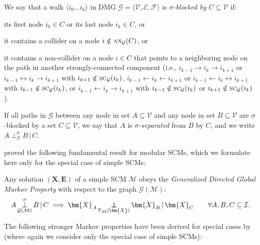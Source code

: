 \documentclass[twoside,11pt]{article}
\DeclareMathOperator*{\CI}{{\,\perp\mkern-12mu\perp\,}}
\DeclareMathOperator*{\SEP}{\perp}
\newcommand\indep[4]{{#1} \CI_{#4} {#2} \given {#3}}
\newcommand{\sigmasep}[4]{{#1} \SEP_{#4}^\sigma {#2} \given {#3}}
\newcommand{\Prb}{\mathbb{P}}
\newcommand\B[1]{\bm{#1}}
\newcommand\C[1]{\mathcal{#1}}
\newcommand\mathbfsc[1]{\text{\normalfont\scshape#1}}
\newcommand\ansub[2]{\mathbfsc{an}_{#1}(#2)}
\newcommand\sccsub[2]{\mathbfsc{sc}_{#1}(#2)}
\newcommand\given{\,|\,}
\newcommand{\ot}{\leftarrow}
\newcommand{\oto}{\leftrightarrow}
\begin{document}
\begin{definition}
We say that a walk $\langle i_0 \dots i_k \rangle$ in DMG $\C{G} = \langle \C{V},\C{E},\C{F} \rangle$ is \emph{$\sigma$-blocked by $C \subseteq \C{V}$} if:
\begin{compactenum}[(i)]
\item its first node $i_0 \in C$ or its last node $i_k \in C$, or
\item it contains a collider on a node $i \notin \ansub{\C{G}}{C}$, or
\item it contains a non-collider on a node $i \in C$ that points to a 
neighboring node on the path in another strongly-connected component (i.e.,
$i_{k-1} \to i_k \to i_{k+1}$ or $i_{k-1}\oto i_k \to i_{k+1}$ with $i_{k+1} \notin \sccsub{\C{G}}{i_k}$,
$i_{k-1} \ot i_k \ot i_{k+1}$ or $i_{k-1}\ot i_k \oto i_{k+1}$ with $i_{k-1} \notin \sccsub{\C{G}}{i_k}$,
or $i_{k-1} \ot i_k \to i_{k+1}$ with $i_{k-1} \notin \sccsub{\C{G}}{i_k}$ or $i_{k+1} \notin \sccsub{\C{G}}{i_k}$).
\end{compactenum}
If all paths in $\C{G}$ between any node in set $A \subseteq \C{V}$ and any node in set $B \subseteq \C{V}$
are $\sigma$-blocked by a set $C \subseteq \C{V}$, we say that $A$ is \emph{$\sigma$-separated}
from $B$ by $C$, and we write $\sigmasep{A}{B}{C}{\C{G}}$.
\end{definition}
\citet{ForreMooij_1710.08775} proved the following fundamental result for modular SCMs, which we formulate here only for
the special case of simple SCMs:
\begin{theorem}\label{thm:sigma_separation}
Any solution $(\B{X},\B{E})$ of a simple SCM $\C{M}$ obeys the \emph{Generalized Directed Global Markov Property} 
with respect to the graph $\C{G}(\C{M})$:
$$\sigmasep{A}{B}{C}{\C{G}(\C{M})} \implies \indep{\B{X}_A}{\B{X}_B}{\B{X}_C}{\Prb_{\C{M}}(\B{X})} \qquad \forall A,B,C \subseteq \C{I}.$$
\end{theorem}
The following stronger Markov properties have been derived for special cases by \citet{ForreMooij_1710.08775} (where
again we consider only the special case of simple SCMs):
\end{document}
